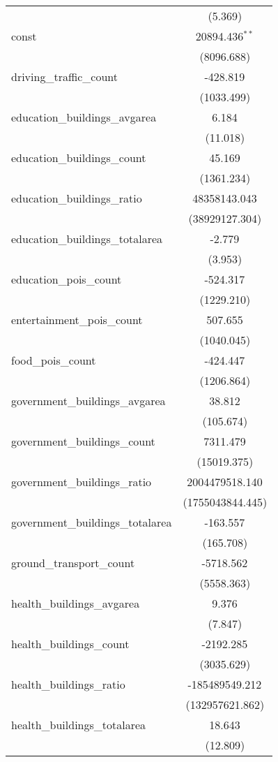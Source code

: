 \begin{table}[!htbp]
\begin{tabular}{@{\extracolsep{5pt}}lc}
  & (5.369) \\
 const & 20894.436$^{**}$ \\
  & (8096.688) \\
 driving_traffic_count & -428.819$^{}$ \\
  & (1033.499) \\
 education_buildings_avgarea & 6.184$^{}$ \\
  & (11.018) \\
 education_buildings_count & 45.169$^{}$ \\
  & (1361.234) \\
 education_buildings_ratio & 48358143.043$^{}$ \\
  & (38929127.304) \\
 education_buildings_totalarea & -2.779$^{}$ \\
  & (3.953) \\
 education_pois_count & -524.317$^{}$ \\
  & (1229.210) \\
 entertainment_pois_count & 507.655$^{}$ \\
  & (1040.045) \\
 food_pois_count & -424.447$^{}$ \\
  & (1206.864) \\
 government_buildings_avgarea & 38.812$^{}$ \\
  & (105.674) \\
 government_buildings_count & 7311.479$^{}$ \\
  & (15019.375) \\
 government_buildings_ratio & 2004479518.140$^{}$ \\
  & (1755043844.445) \\
 government_buildings_totalarea & -163.557$^{}$ \\
  & (165.708) \\
 ground_transport_count & -5718.562$^{}$ \\
  & (5558.363) \\
 health_buildings_avgarea & 9.376$^{}$ \\
  & (7.847) \\
 health_buildings_count & -2192.285$^{}$ \\
  & (3035.629) \\
 health_buildings_ratio & -185489549.212$^{}$ \\
  & (132957621.862) \\
 health_buildings_totalarea & 18.643$^{}$ \\
  & (12.809) \\

\end{tabular}
\end{table}
